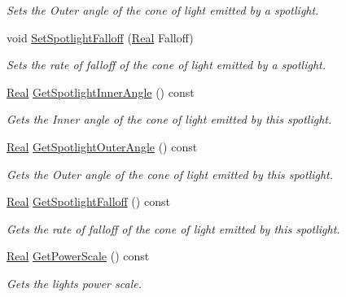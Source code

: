 \begin{DoxyCompactItemize}
\begin{DoxyCompactList}\small\item\em Sets the Outer angle of the cone of light emitted by a spotlight. \item\end{DoxyCompactList}\item 
void \hyperlink{classphys_1_1Light_a170e0fc23e3a50587a483fa8981b5486}{SetSpotlightFalloff} (\hyperlink{namespacephys_af7eb897198d265b8e868f45240230d5f}{Real} Falloff)
\begin{DoxyCompactList}\small\item\em Sets the rate of falloff of the cone of light emitted by a spotlight. \item\end{DoxyCompactList}\item 
\hyperlink{namespacephys_af7eb897198d265b8e868f45240230d5f}{Real} \hyperlink{classphys_1_1Light_a429728b3eb1287806c70a24666705213}{GetSpotlightInnerAngle} () const 
\begin{DoxyCompactList}\small\item\em Gets the Inner angle of the cone of light emitted by this spotlight. \item\end{DoxyCompactList}\item 
\hyperlink{namespacephys_af7eb897198d265b8e868f45240230d5f}{Real} \hyperlink{classphys_1_1Light_a669ab7936e718263d02343ef03333bad}{GetSpotlightOuterAngle} () const 
\begin{DoxyCompactList}\small\item\em Gets the Outer angle of the cone of light emitted by this spotlight. \item\end{DoxyCompactList}\item 
\hyperlink{namespacephys_af7eb897198d265b8e868f45240230d5f}{Real} \hyperlink{classphys_1_1Light_a7682e55d5210c2433060dd9e4f4669ba}{GetSpotlightFalloff} () const 
\begin{DoxyCompactList}\small\item\em Gets the rate of falloff of the cone of light emitted by this spotlight. \item\end{DoxyCompactList}\item 
\hyperlink{namespacephys_af7eb897198d265b8e868f45240230d5f}{Real} \hyperlink{classphys_1_1Light_add09593ac1e57a946aa5f0c319dd56ae}{GetPowerScale} () const 
\begin{DoxyCompactList}\small\item\em Gets the lights power scale. \item\end{DoxyCompactList}\item 

\end{DoxyCompactItemize}
